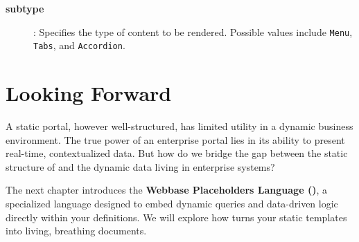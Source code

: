 \begin{description}
\item[\textbf{subtype}]: Specifies the type of content to be rendered. Possible values include \texttt{Menu}, \texttt{Tabs}, and \texttt{Accordion}.
\end{description}

\section{Looking Forward}
\label{sec:wbdl-forward}

A static portal, however well-structured, has limited utility in a dynamic business environment. The true power of an enterprise portal lies in its ability to present real-time, contextualized data. But how do we bridge the gap between the static structure of \wbdl{} and the dynamic data living in enterprise systems?

The next chapter introduces the \textbf{Webbase Placeholders Language (\wbpl{})}, a specialized language designed to embed dynamic queries and data-driven logic directly within your \wbdl{} definitions. We will explore how \wbpl{} turns your static templates into living, breathing documents.
